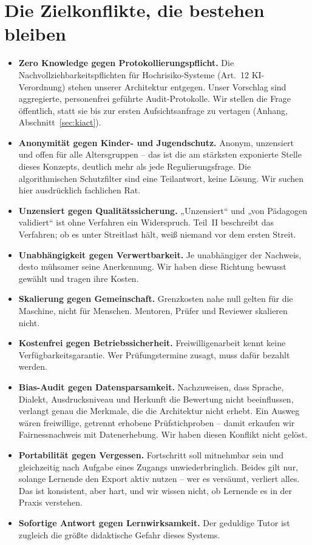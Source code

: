 \documentclass[11pt,a4paper]{article}
\begin{document}
\section{Die Zielkonflikte, die bestehen bleiben}
\begin{itemize}[label=--]
    \item \textbf{Zero Knowledge gegen Protokollierungspflicht.} Die Nachvollziehbarkeitspflichten für Hochrisiko-Systeme (Art.~12 KI-Verordnung) stehen unserer Architektur entgegen. Unser Vorschlag sind aggregierte, personenfrei geführte Audit-Protokolle. Wir stellen die Frage öffentlich, statt sie bis zur ersten Aufsichtsanfrage zu vertagen (Anhang, Abschnitt~\ref{sec:kiact}).
    \item \textbf{Anonymität gegen Kinder- und Jugendschutz.} Anonym, unzensiert und offen für alle Altersgruppen -- das ist die am stärksten exponierte Stelle dieses Konzepts, deutlich mehr als jede Regulierungsfrage. Die algorithmischen Schutzfilter sind eine Teilantwort, keine Lösung. Wir suchen hier ausdrücklich fachlichen Rat.
    \item \textbf{Unzensiert gegen Qualitätssicherung.} „Unzensiert“ und „von Pädagogen validiert“ ist ohne Verfahren ein Widerspruch. Teil~II beschreibt das Verfahren; ob es unter Streitlast hält, weiß niemand vor dem ersten Streit.
    \item \textbf{Unabhängigkeit gegen Verwertbarkeit.} Je unabhängiger der Nachweis, desto mühsamer seine Anerkennung. Wir haben diese Richtung bewusst gewählt und tragen ihre Kosten.
    \item \textbf{Skalierung gegen Gemeinschaft.} Grenzkosten nahe null gelten für die Maschine, nicht für Menschen. Mentoren, Prüfer und Reviewer skalieren nicht.
    \item \textbf{Kostenfrei gegen Betriebssicherheit.} Freiwilligenarbeit kennt keine Verfügbarkeitsgarantie. Wer Prüfungstermine zusagt, muss dafür bezahlt werden.
    \item \textbf{Bias-Audit gegen Datensparsamkeit.} Nachzuweisen, dass Sprache, Dialekt, Ausdrucksniveau und Herkunft die Bewertung nicht beeinflussen, verlangt genau die Merkmale, die die Architektur nicht erhebt. Ein Ausweg wären freiwillige, getrennt erhobene Prüfstichproben -- damit erkaufen wir Fairnessnachweis mit Datenerhebung. Wir haben diesen Konflikt nicht gelöst.
    \item \textbf{Portabilität gegen Vergessen.} Fortschritt soll mitnehmbar sein und gleichzeitig nach Aufgabe eines Zugangs unwiederbringlich. Beides gilt nur, solange Lernende den Export aktiv nutzen -- wer es versäumt, verliert alles. Das ist konsistent, aber hart, und wir wissen nicht, ob Lernende es in der Praxis verstehen.
    \item \textbf{Sofortige Antwort gegen Lernwirksamkeit.} Der geduldige Tutor ist zugleich die größte didaktische Gefahr dieses Systems.
\end{itemize}
\end{document}
